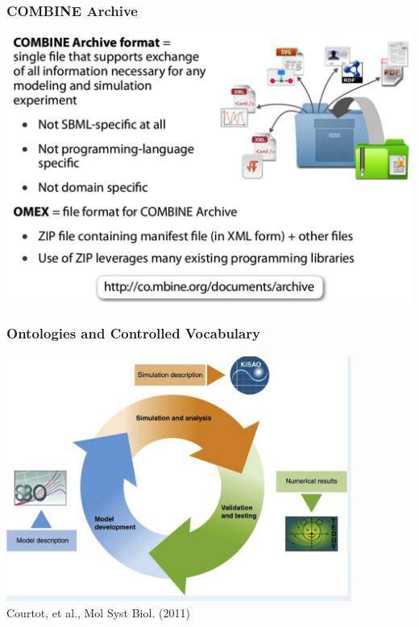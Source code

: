 \documentclass{beamer}
\begin{document}
\begin{frame}\frametitle{COMBINE Archive}
\begin{center}
\includegraphics[width=\textwidth]{figs/Archive}
\end{center}
\end{frame}

\begin{frame}\frametitle{Ontologies and Controlled Vocabulary}
\begin{center}
\includegraphics[width=0.85\textwidth]{figs/vocabularies}\\
Courtot, et al., Mol Syst Biol. (2011)
\end{center}
\end{frame}
\end{document}
